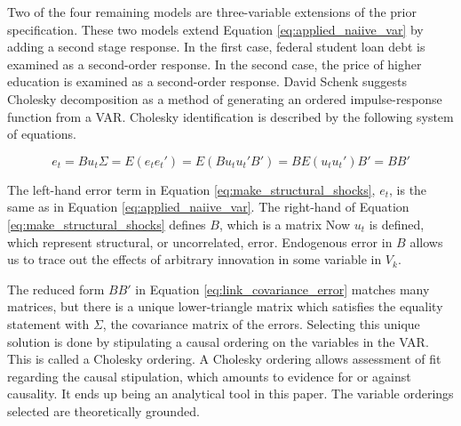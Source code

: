 \documentclass[review]{elsarticle}
\begin{document}
Two of the four remaining models are three-variable extensions of the prior specification.
These two models extend Equation \ref{eq:applied_naiive_var} by adding a second stage response.
In the first case, federal student loan debt is examined as a second-order response.
In the second case, the price of higher education is examined as a second-order response.
David Schenk suggests Cholesky decomposition as a method of generating an ordered impulse-response function from a VAR\cite{schenck_2016}.
Cholesky identification is described by the following system of equations.

\begin{subequations}
    \begin{equation}
        e_t = Bu_t
        \label{eq:make_structural_shocks}
    \end{equation}
    \begin{equation}
        \Sigma = E(e_t e_t')
        = E(Bu_tu_t'B')
        = B E(u_t u_t') B'
        = B B'
        \label{eq:link_covariance_error}
    \end{equation}
\end{subequations}

The left-hand error term in Equation \ref{eq:make_structural_shocks}, $e_t$,
is the same as in Equation \ref{eq:applied_naiive_var}.
The right-hand of Equation \ref{eq:make_structural_shocks} defines $B$,
which is a matrix
Now $u_t$ is defined, which represent structural, or uncorrelated, error.
Endogenous error in $B$ allows us to trace out the effects of arbitrary innovation
in some variable in $V_k$.

The reduced form $BB'$ in Equation \ref{eq:link_covariance_error} matches many
matrices, but there is a unique lower-triangle matrix which satisfies the equality
statement with $\Sigma$, the covariance matrix of the errors.
Selecting this unique solution is done by stipulating a causal ordering on the variables in the VAR.
This is called a Cholesky ordering.
A Cholesky ordering allows assessment of fit regarding the causal stipulation,
which amounts to evidence for or against causality.
It ends up being an analytical tool in this paper.
The variable orderings selected are theoretically grounded.
\end{document}

